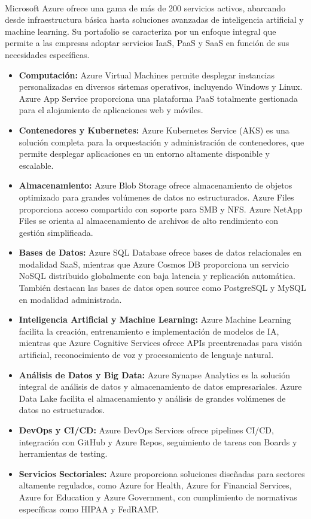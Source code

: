 {            \paragraph{}Microsoft Azure ofrece una gama de más de 200 servicios activos, abarcando desde infraestructura básica hasta soluciones avanzadas de inteligencia artificial y machine learning. Su portafolio se caracteriza por un enfoque integral que permite a las empresas adoptar servicios IaaS, PaaS y SaaS en función de sus necesidades específicas.
            
            \begin{itemize}
                \item \textbf{Computación:} Azure Virtual Machines permite desplegar instancias personalizadas en diversos sistemas operativos, incluyendo Windows y Linux. Azure App Service proporciona una plataforma PaaS totalmente gestionada para el alojamiento de aplicaciones web y móviles.
                \item \textbf{Contenedores y Kubernetes:} Azure Kubernetes Service (AKS) es una solución completa para la orquestación y administración de contenedores, que permite desplegar aplicaciones en un entorno altamente disponible y escalable.
                \item \textbf{Almacenamiento:} Azure Blob Storage ofrece almacenamiento de objetos optimizado para grandes volúmenes de datos no estructurados. Azure Files proporciona acceso compartido con soporte para SMB y NFS. Azure NetApp Files se orienta al almacenamiento de archivos de alto rendimiento con gestión simplificada.
                \item \textbf{Bases de Datos:} Azure SQL Database ofrece bases de datos relacionales en modalidad SaaS, mientras que Azure Cosmos DB proporciona un servicio NoSQL distribuido globalmente con baja latencia y replicación automática. También destacan las bases de datos open source como PostgreSQL y MySQL en modalidad administrada.
                \item \textbf{Inteligencia Artificial y Machine Learning:} Azure Machine Learning facilita la creación, entrenamiento e implementación de modelos de IA, mientras que Azure Cognitive Services ofrece APIs preentrenadas para visión artificial, reconocimiento de voz y procesamiento de lenguaje natural. \item \textbf{Análisis de Datos y Big Data:} Azure Synapse Analytics es la solución integral de análisis de datos y almacenamiento de datos empresariales. Azure Data Lake facilita el almacenamiento y análisis de grandes volúmenes de datos no estructurados.
                \item \textbf{DevOps y CI/CD:} Azure DevOps Services ofrece pipelines CI/CD, integración con GitHub y Azure Repos, seguimiento de tareas con Boards y herramientas de testing.
                \item \textbf{Servicios Sectoriales:} Azure proporciona soluciones diseñadas para sectores altamente regulados, como Azure for Health, Azure for Financial Services, Azure for Education y Azure Government, con cumplimiento de normativas específicas como HIPAA y FedRAMP.
            \end{itemize}

}
